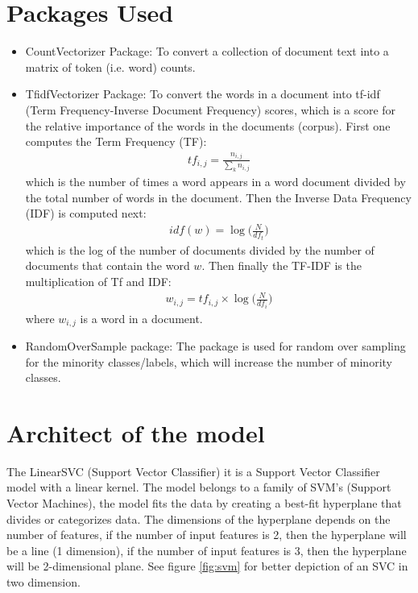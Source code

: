 \documentclass[12pt,a4paper]{article}
\begin{document}
\section{Packages Used}
\begin{itemize}
\item CountVectorizer Package: To convert a collection of document text into a matrix of token (i.e. word) counts. 
\end{itemize}

\begin{itemize}
\item TfidfVectorizer Package: To convert the words in a document into tf-idf (Term Frequency-Inverse Document Frequency) scores, which is a score for the relative importance of the words in the documents (corpus). First one computes the Term Frequency (TF):
\begin{align}
tf_{i,j}=\frac{n_{i,j}}{\sum_k n_{i,j}}
\end{align}
\noindent which is the number of times a word appears in a word document divided by the total number of words in the document. Then the Inverse Data Frequency (IDF) is computed next:
\begin{align}
idf(w)=\log\bigg(\frac{N}{df_t}\bigg)
\end{align}
which is the log of the number of documents divided by the number of documents that contain the word $w$. Then finally the TF-IDF is the multiplication of Tf and IDF:
\begin{align}
w_{i,j}=tf_{i,j}\times \log\bigg(\frac{N}{df_i}\bigg)
\end{align}
where $w_{i,j}$ is a word in a document.
\end{itemize}

\begin{itemize}
\item RandomOverSample package: The package is used for random over sampling for the minority classes/labels, which will increase the number of minority classes.
\end{itemize}

\section{Architect of the model}
\noindent The LinearSVC (Support Vector Classifier) it is a Support Vector Classifier model with a linear kernel. The model belongs to a family of SVM's (Support Vector Machines), the model fits the data by creating a best-fit hyperplane that divides or categorizes data. The dimensions of the hyperplane depends on the number of features, if the number of input features is 2, then the hyperplane will be a line (1 dimension), if the number of input features is 3, then the hyperplane will be 2-dimensional plane. See figure \ref{fig:svm} for better depiction of an SVC in two dimension.
\end{document}

